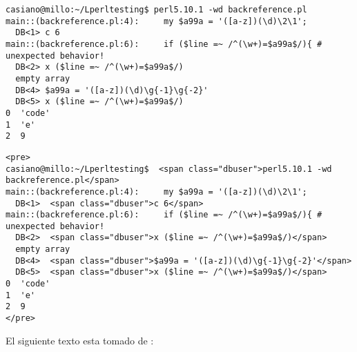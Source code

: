 \begin{latexonly}
\begin{verbatim}
casiano@millo:~/Lperltesting$ perl5.10.1 -wd backreference.pl
main::(backreference.pl:4):     my $a99a = '([a-z])(\d)\2\1';
  DB<1> c 6
main::(backreference.pl:6):     if ($line =~ /^(\w+)=$a99a$/){ # unexpected behavior!
  DB<2> x ($line =~ /^(\w+)=$a99a$/)
  empty array
  DB<4> $a99a = '([a-z])(\d)\g{-1}\g{-2}'
  DB<5> x ($line =~ /^(\w+)=$a99a$/)
0  'code'
1  'e'
2  9
\end{verbatim}
\end{latexonly}
\begin{verbatim}
<pre>
casiano@millo:~/Lperltesting$  <span class="dbuser">perl5.10.1 -wd backreference.pl</span>
main::(backreference.pl:4):     my $a99a = '([a-z])(\d)\2\1';
  DB<1>  <span class="dbuser">c 6</span>
main::(backreference.pl:6):     if ($line =~ /^(\w+)=$a99a$/){ # unexpected behavior!
  DB<2>  <span class="dbuser">x ($line =~ /^(\w+)=$a99a$/)</span>
  empty array
  DB<4>  <span class="dbuser">$a99a = '([a-z])(\d)\g{-1}\g{-2}'</span>
  DB<5>  <span class="dbuser">x ($line =~ /^(\w+)=$a99a$/)</span>
0  'code'
1  'e'
2  9
</pre>
\end{verbatim}


El siguiente texto esta tomado de 
:

